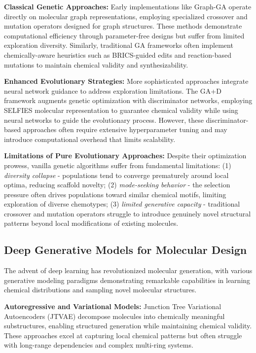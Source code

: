 \documentclass[lettersize,journal]{IEEEtran}
\begin{document}
\noindent \textbf{Classical Genetic Approaches:} Early implementations like Graph-GA \cite{jensenGraphBasedGeneticAlgorithm2019} operate directly on molecular graph representations, employing specialized crossover and mutation operators designed for graph structures. These methods demonstrate computational efficiency through parameter-free designs but suffer from limited exploration diversity. Similarly, traditional GA frameworks often implement chemically-aware heuristics such as BRICS-guided edits and reaction-based mutations to maintain chemical validity and synthesizability.

\noindent \textbf{Enhanced Evolutionary Strategies:} More sophisticated approaches integrate neural network guidance to address exploration limitations. The GA+D framework \cite{nigamAugmentingGeneticAlgorithms2020} augments genetic optimization with discriminator networks, employing SELFIES molecular representation to guarantee chemical validity while using neural networks to guide the evolutionary process. However, these discriminator-based approaches often require extensive hyperparameter tuning and may introduce computational overhead that limits scalability.

\noindent \textbf{Limitations of Pure Evolutionary Approaches:} Despite their optimization prowess, vanilla genetic algorithms suffer from fundamental limitations: (1) \textit{diversity collapse} - populations tend to converge prematurely around local optima, reducing scaffold novelty; (2) \textit{mode-seeking behavior} - the selection pressure often drives populations toward similar chemical motifs, limiting exploration of diverse chemotypes; (3) \textit{limited generative capacity} - traditional crossover and mutation operators struggle to introduce genuinely novel structural patterns beyond local modifications of existing molecules.

\subsection{Deep Generative Models for Molecular Design}

The advent of deep learning has revolutionized molecular generation, with various generative modeling paradigms demonstrating remarkable capabilities in learning chemical distributions and sampling novel molecular structures.

\noindent \textbf{Autoregressive and Variational Models:} Junction Tree Variational Autoencoders (JTVAE) \cite{jinJunctionTreeVariational2018} decompose molecules into chemically meaningful substructures, enabling structured generation while maintaining chemical validity. These approaches excel at capturing local chemical patterns but often struggle with long-range dependencies and complex multi-ring systems.
\end{document}
